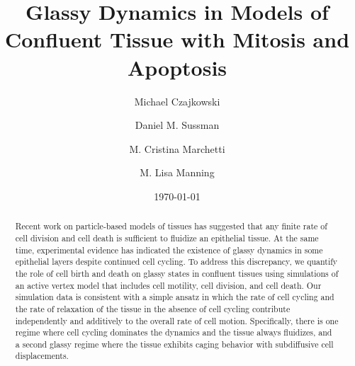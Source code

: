 \documentclass[
reprint
,aps
,amssymb
,amsmath
,superscriptaddress
]{revtex4-1}
\begin{document}
\title{Glassy Dynamics in Models of Confluent Tissue with Mitosis and Apoptosis}

\begin{abstract}
Recent work on particle-based models of tissues has suggested that any finite rate of cell division and cell death is sufficient to fluidize an epithelial tissue. At the same time, experimental evidence has indicated the existence of glassy dynamics in some epithelial layers despite continued cell cycling. To address this discrepancy, we quantify the role of cell birth and death on glassy states in confluent tissues using simulations of an active vertex model that includes cell motility, cell division, and cell death. Our simulation data is consistent with a simple ansatz in which the rate of cell cycling and the rate of relaxation of the tissue in the absence of cell cycling contribute independently and additively to the overall rate of cell motion. Specifically, there is one regime where cell cycling dominates the dynamics and the tissue always fluidizes, and a second glassy regime where the tissue exhibits caging behavior with subdiffusive cell displacements.

\end{abstract}


\author{Michael Czajkowski}
\author{Daniel M. Sussman}
\author{M. Cristina Marchetti}
\author{M. Lisa Manning}
\date{\today}
 
\end{document}
